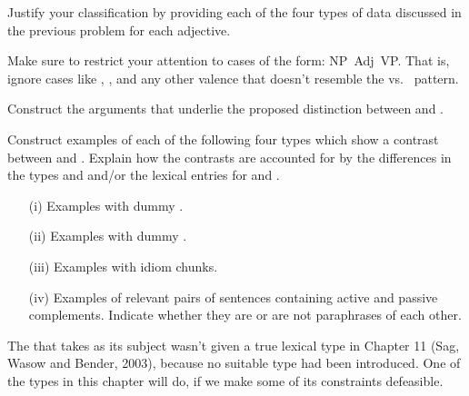 \documentclass[a4paper,landscape,headrule,footrule,dvips]{foils}
\begin{document}
\noindent
Justify your classification by providing each of the four types
of data discussed in the previous problem for each adjective.

Make sure to restrict your attention to cases of the form: \hbox{NP
   Adj  VP}. That is, ignore cases like , , and
any other valence that doesn't resemble the  vs.\
 pattern.


Construct the arguments that underlie the proposed distinction between
\typ{orv-lxm} and \typ{ocv-lxm}.

Construct examples of each of the following four types which 
show a contrast between  and .  Explain how
the contrasts are accounted for by the differences in the types
 and  and/or the lexical entries for 
and \lex{persuade}.

\begin{itemize} \addtolength{\itemsep}{-1ex}
\item[(i)] Examples with dummy .

\item[(ii)] Examples with dummy .

\item[(iii)] Examples with idiom chunks.

\item[(iv)] Examples of relevant pairs of sentences containing 
active and passive complements.  Indicate whether they are or are
not paraphrases of each other.
\end{itemize}





The  that takes  as its subject wasn't given a true
lexical type in Chapter 11 (Sag, Wasow and Bender, 2003), because no
suitable type had been introduced.  One of the types in this chapter
will do, if we make some of its constraints defeasible.
\end{document}
